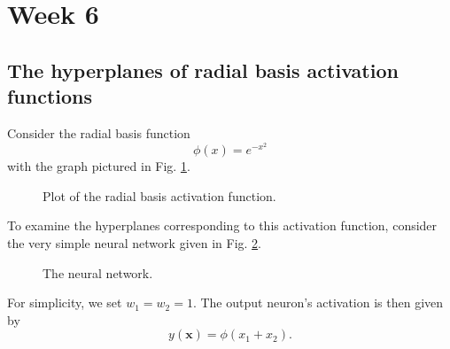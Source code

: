 \documentclass{article}
\renewcommand\vec{\mathbf}
\begin{document}
\section{Week 6}

\subsection{The hyperplanes of radial basis activation functions}
Consider the radial basis function
\begin{equation}
    \label{eq:week6:rbf}
    \phi(x) = e^{-x^2}
\end{equation}
with the graph pictured in Fig. \ref{fig:week6:rbf:plot}.

\begin{figure}[h]
    \centering
    \caption{Plot of the radial basis activation function.}
    \label{fig:week6:rbf:plot}
\end{figure}

To examine the hyperplanes corresponding to this activation function, consider the very simple neural network given in Fig. \ref{fig:week6:rbf:neuralnet}. 
\begin{figure}[h]
    \centering
    \caption{The neural network.}
    \label{fig:week6:rbf:neuralnet}
\end{figure}

For simplicity, we set $w_1=w_2=1$. 
The output neuron's activation is then given by 
\begin{equation*}
    y(\vec{x}) = \phi(x_1 + x_2).
\end{equation*}
\end{document}
